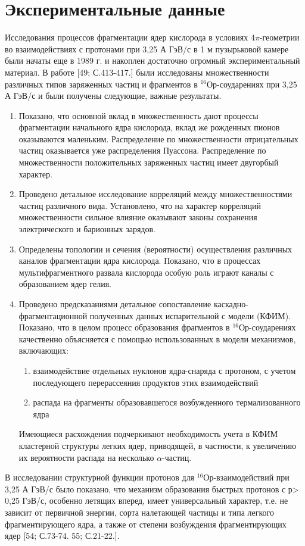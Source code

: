 \documentclass[fontsize=14pt]{scrreport}
\begin{document}
\section{Экспериментальные данные}
\hspace{0.6cm}
Исследования процессов фрагментации ядер кислорода в условиях 4$\pi$-геометрии во взаимодействиях с протонами при 3,25 А ГэВ/с в 1 м пузырьковой камере были начаты еще в 1989 г. и накоплен достаточно огромный экспериментальный материал. В работе [49; С.413-417.] были исследованы множественности различных типов заряженных частиц и фрагментов в $^{16}$Ор-соударениях при 3,25 А ГэВ/с и были получены следующие, важные результаты.
\begin{enumerate}
    \item Показано, что основной вклад в множественность дают процессы фрагментации начального ядра кислорода, вклад же рожденных пионов оказываются маленьким. Распределение по множественности отрицательных частиц оказывается уже распределения Пуассона. Распределение по множественности положительных заряженных частиц имеет двугорбый характер.
    \item Проведено детальное исследование корреляций между множественностями частиц различного вида. Установлено, что на характер корреляций множественности сильное влияние оказывают законы сохранения электрического и барионных зарядов.
    \item Определены топологии и сечения (вероятности) осуществления различных каналов фрагментации ядра кислорода. Показано, что в процессах мультифрагментного развала кислорода особую роль играют каналы с образованием ядер гелия.
    \item Проведено предсказаниями детальное сопоставление каскадно-фрагментационной полученных данных испарительной с модели (КФИМ). Показано, что в целом процесс образования фрагментов в $^{16}$Ор-соударениях качественно объясняется с помощью использованных в модели механизмов, включающих: 
    \begin{enumerate}
        \item взаимодействие отдельных нуклонов ядра-снаряда с протоном, с учетом последующего перерассеяния продуктов этих взаимодействий
        \item распада на фрагменты образовавшегося возбужденного термализованного ядра
    \end{enumerate}
    Имеющиеся расхождения подчеркивают необходимость учета в КФИМ кластерной структуры легких ядер, приводящей, в частности, к увеличению их вероятности распада на несколько $\alpha$-частиц.
\end{enumerate}
В исследовании структурной функции протонов для $^{16}$Ор-взаимодействий при 3,25 А ГэВ/с было показано, что механизм образования быстрых протонов с р> 0,25 ГэВ/с, особенно летящих вперед, имеет универсальный характер, т.е. не зависит от первичной
энергии, сорта налетающей частицы и типа легкого фрагментирующего ядра, а также от степени возбуждения фрагментирующих ядер [54; С.73-74. 55; С.21-22.].
\end{document}
